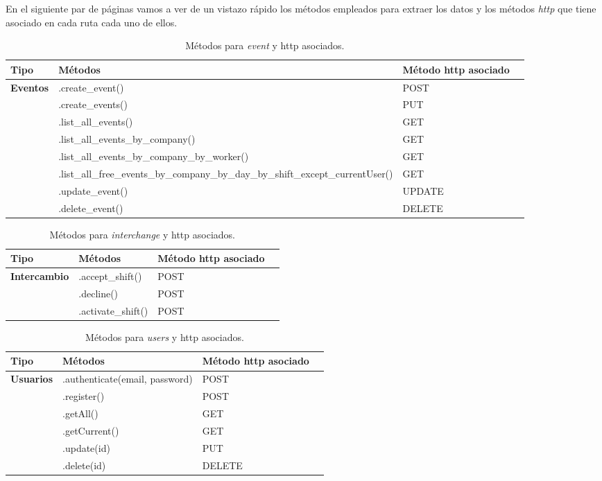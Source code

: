 \begin{itemize}
En el siguiente par de páginas vamos a ver de un vistazo rápido los métodos empleados para extraer los datos y los métodos \emph{http} que tiene asociado en cada ruta cada uno de ellos. 
\begin{landscape}
\begin{table}[H]
\centering
\begin{tabular}{|l|l|l|l|}
\hline
Tipo  & Métodos & Método http asociado \\
\hline \hline
\textbf{Eventos} & .create\_event()  & POST \\ \hline
    & .create\_events()  &  PUT \\ \hline
    & .list\_all\_events()  & GET \\ \hline
    & .list\_all\_events\_by\_company()  &  GET\\ \hline
    & .list\_all\_events\_by\_company\_by\_worker() & GET \\ \hline
    & .list\_all\_free\_events\_by\_company\_by\_day\_by\_shift\_except\_currentUser() & GET\\ \hline
    & .update\_event()  & UPDATE \\ \hline
    & .delete\_event() & DELETE \\ \hline
    \hline \hline
\end{tabular}
\caption{Métodos para \emph{event} y http asociados.}
\end{table}

\begin{table}[H]
\centering
\begin{tabular}{|l|l|l|l|}
\hline
Tipo  & Métodos & Método http asociado \\
\hline \hline
\textbf{Intercambio} & .accept\_shift()  & POST \\ \hline
    & .decline()  & POST  \\ \hline
    & .activate\_shift()  &  POST \\ \hline
    \hline \hline
\end{tabular}
\caption{Métodos para \emph{interchange} y http asociados.}
\end{table}


\begin{table}[H]
\centering
\begin{tabular}{|l|l|l|l|}
\hline
Tipo  & Métodos & Método http asociado \\
\hline \hline
\textbf{Usuarios} & .authenticate(email, password)  & POST \\ \hline
    & .register()  & POST \\ \hline
    & .getAll()  &  GET\\ \hline
    & .getCurrent()  &  GET\\ \hline
    & .update(id)  &  PUT \\ \hline
    & .delete(id)  & DELETE \\ \hline
    \hline \hline
\end{tabular}
\caption{Métodos para \emph{users} y http asociados.}
\end{table}


\end{landscape}
\end{itemize}
